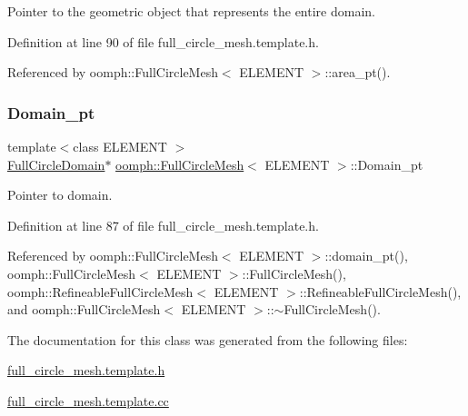 Pointer to the geometric object that represents the entire domain. 



Definition at line 90 of file full\+\_\+circle\+\_\+mesh.\+template.\+h.



Referenced by oomph\+::\+Full\+Circle\+Mesh$<$ E\+L\+E\+M\+E\+N\+T $>$\+::area\+\_\+pt().

\mbox{\label{classoomph_1_1FullCircleMesh_a042c0729727a71bee0660f44c33f8691}} 
\subsubsection{\texorpdfstring{Domain\+\_\+pt}{Domain\_pt}}
{\footnotesize\ttfamily template$<$class E\+L\+E\+M\+E\+NT $>$ \\
\hyperlink{classoomph_1_1FullCircleDomain}{Full\+Circle\+Domain}$\ast$ \hyperlink{classoomph_1_1FullCircleMesh}{oomph\+::\+Full\+Circle\+Mesh}$<$ E\+L\+E\+M\+E\+NT $>$\+::Domain\+\_\+pt\hspace{0.3cm}{\ttfamily [protected]}}



Pointer to domain. 



Definition at line 87 of file full\+\_\+circle\+\_\+mesh.\+template.\+h.



Referenced by oomph\+::\+Full\+Circle\+Mesh$<$ E\+L\+E\+M\+E\+N\+T $>$\+::domain\+\_\+pt(), oomph\+::\+Full\+Circle\+Mesh$<$ E\+L\+E\+M\+E\+N\+T $>$\+::\+Full\+Circle\+Mesh(), oomph\+::\+Refineable\+Full\+Circle\+Mesh$<$ E\+L\+E\+M\+E\+N\+T $>$\+::\+Refineable\+Full\+Circle\+Mesh(), and oomph\+::\+Full\+Circle\+Mesh$<$ E\+L\+E\+M\+E\+N\+T $>$\+::$\sim$\+Full\+Circle\+Mesh().



The documentation for this class was generated from the following files\+:\begin{DoxyCompactItemize}
\item 
\hyperlink{full__circle__mesh_8template_8h}{full\+\_\+circle\+\_\+mesh.\+template.\+h}\item 
\hyperlink{full__circle__mesh_8template_8cc}{full\+\_\+circle\+\_\+mesh.\+template.\+cc}\end{DoxyCompactItemize}
